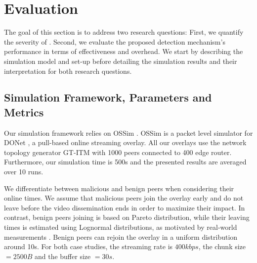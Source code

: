 \section{Evaluation}
\label{sec:eval}

The goal of this section is to address two research questions: 
First, we quantify the severity of \drop. 
Second, we evaluate the proposed detection mechanism's performance in terms of effectiveness and overhead. 
We start by describing the simulation model and set-up before detailing the simulation results and their interpretation for both research questions.


\subsection{Simulation Framework, Parameters and Metrics}
Our simulation framework relies on OSSim \cite{nguyen2013ossim}. 
OSSim is a packet level simulator for DONet \cite{zhang2005coolstreaming}, a pull-based online streaming overlay.
All our overlays use the network topology generator GT-ITM \cite{GT} with 1000 peers connected to 400 edge router. Furthermore, our simulation time is 500s and the presented results are averaged over 10 runs. 

We differentiate between malicious and benign peers when considering their online times. 
We assume that malicious peers join the overlay early and do not leave before the video dissemination ends in order to maximize their impact. 
In contrast,  benign peers joining is based on Pareto distribution, while their leaving times is estimated using Lognormal distributions, as motivated by real-world measurements \cite{distribution}.
Benign peers can rejoin the overlay in a uniform distribution around 10s. For both case studies, the streaming rate is $400kbps$, the chunk size $=2500B$ and the buffer size $=30s$.


% 
% 
% 
%   

